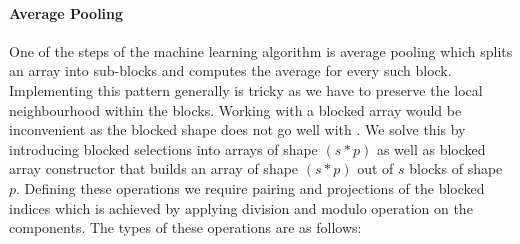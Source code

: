 \paragraph{Average Pooling}
One of the steps of the machine learning algorithm is average pooling which
splits an array into sub-blocks and computes the average for every such
block.  Implementing this pattern generally is tricky as we have to
preserve the local neighbourhood within the blocks.  Working with a
blocked array would be inconvenient as the blocked shape
does not go well with .  We solve this by introducing
blocked selections  into arrays of shape $(s * p)$ as well
as blocked array constructor  that builds an array of
shape $(s * p)$ out of $s$ blocks of shape $p$.  Defining these
operations we require pairing and projections of the blocked indices
which is achieved by applying division and modulo operation on the
components.  The types of these operations are as follows:
